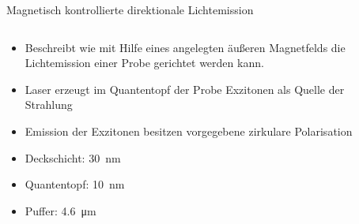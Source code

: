 \begin{frame}{Magnetisch kontrollierte direktionale Lichtemission}
    \pause
    \begin{columns}
        \begin{column}{0.5\textwidth}
            \begin{itemize}
                \item <1-> Beschreibt wie mit Hilfe eines
                angelegten äußeren Magnetfelds die Lichtemission einer Probe gerichtet
                werden kann. 
                \bigskip   
                \item <3-> Laser erzeugt im Quantentopf der
                Probe Exzitonen als Quelle der Strahlung
                \bigskip   
                \item <4-> Emission der Exzitonen besitzen vorgegebene zirkulare Polarisation
                \bigskip
                \item <5->  Deckschicht: \SI{30}{\nano\meter}
                \item <5->  Quantentopf: \SI{10}{\nano\meter}
                \item <5->  Puffer: \SI{4,6}{\micro\meter}
            \end{itemize}
        \end{column}
        \begin{column}{0.5\textwidth}
            \centering
        \end{column}
    \end{columns}
\end{frame}

